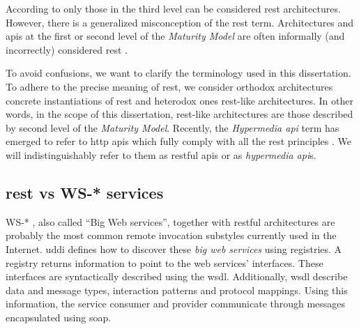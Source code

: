 According to \citet{fielding_architectural_2000} only those in the third level can be considered \ac{rest} architectures.
However, there is a generalized misconception of the \ac{rest} term.
Architectures and \ac{api}s at the first or second level of the \emph{\citeauthor{richardson_introducing_2008} Maturity Model} are often informally (and incorrectly) considered \ac{rest} \citep{fielding_rest_2008,moore_hypermedia_2010,klabnik_nobody_2011}.


To avoid confusions, we want to clarify the terminology used in this dissertation.
To adhere to the precise meaning of \ac{rest}, we consider orthodox architectures concrete instantiations of \ac{rest} and heterodox ones \ac{rest}-like architectures.
In other words, in the scope of this dissertation, \ac{rest}-like architectures are those described by second level of the \emph{\citeauthor{richardson_introducing_2008} Maturity Model}.
Recently, the \emph{Hypermedia \ac{api}} term has emerged to refer to \acs{http} \ac{api}s which fully comply with all the \ac{rest} principles \citep{klabnik_rest_2012,moore_hypermedia_2010,amundsen_building_2011}.  %
We will indistinguishably refer to them as \ac{rest}ful \ac{api}s or as \emph{hypermedia \ac{api}}s.



\subsection{\acs{rest} vs WS-* services}
\label{sec:rest_ws}

WS-* \citep{newcomer_understanding_2002,alonso_web_2010}, also called ``Big Web services'', together with \acs{rest}ful architectures are probably the most common remote invocation substyles currently used in the Internet.
\ac{uddi} defines how to discover these \emph{big web services} using registries.
A registry returns information to point to the web services' interfaces.
These interfaces are syntactically described using the \ac{wsdl}.
Additionally, \ac{wsdl} describe data and message types, interaction patterns and protocol mappings.
Using this information, the service consumer and provider communicate through messages encapsulated using \ac{soap}.


